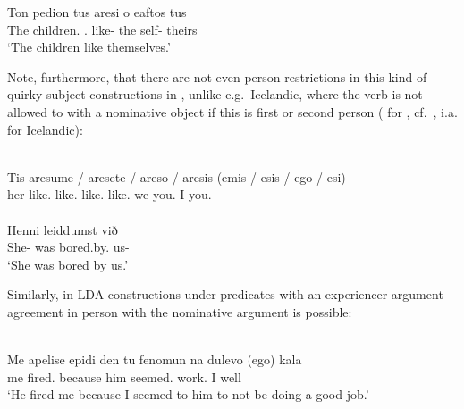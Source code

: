\documentclass[output=paper]{langsci/langscibook}
\begin{document}
\begin{exe}
\ea%
    \label{ex:key:13.33}
    \gll    Ton pedion tus aresi o   eaftos tus\\
            The children.\Dat{} \Cl.\Dat{} like-\Tsg{} the self-\Nom{} theirs\\
    \glt    ‘The children like themselves.’
\z

Note, furthermore, that there are not even person restrictions in this kind of
quirky subject constructions in , unlike e.g.\ Icelandic, where the verb is
not allowed to  with a nominative object if this is first or second person
(\citealt{Anagnostopoulou2003,Anagnostopoulou2005} for , cf.\
\citealt{Sigurdsson1989,Taraldsen1995}, i.a. for Icelandic):

\ea%
\label{ex:key:13.34}
    \ea {}\\
	\gll  Tis aresume / aresete / areso  / aresis    (emis / esis / ego / esi)\\
    her like.\Fpl{} {} like.\Spl{} {} like.\Fsg{} {} like.\Ssg{} \hphantom{(}we {} you.\Pl{} {} I {} you.\Sg{}\\
    \glt
    \ex {}\\
    \gll \llap{*}Henni leiddumst við\\
    She-\Dat{}  was bored.by.\Fpl{} us-\Nom{}\\
    \glt    ‘She was bored by us.’
    \z
\z

Similarly, in \gls{LDA} constructions under  predicates with an
experiencer argument agreement in person with the nominative argument is
possible:

\ea%
\label{ex:key:13.35}\\
    \gll  Me apelise epidi den tu fenomun na dulevo  (ego)  kala\\
    me fired.\Tsg{} because \Neg{} him seemed.\Fsg{} \Sbjv{} work.\Fsg{} \hphantom{(}I well\\
    \glt  ‘He fired me because I seemed to him to not be doing a good job.’
\z

\ea%
    \label{ex:key:13.36}
    \z
\z


\end{exe}
\end{document}
